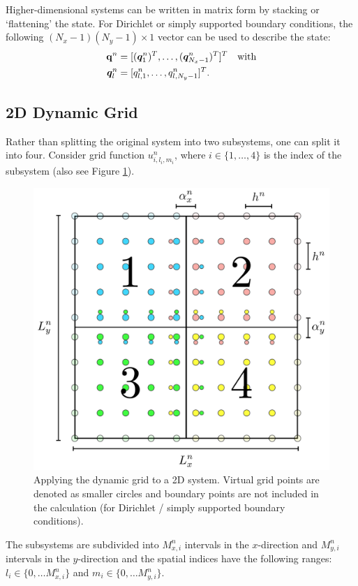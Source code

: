 \documentclass[fleqn]{jaes}
\begin{document}
Higher-dimensional systems can be written in matrix form by stacking or `flattening' the state. For Dirichlet or simply supported boundary conditions, the following $(N_x-1)(N_y-1)\times 1$ vector can be used to describe the state:
\begin{equation}\label{eq:stackedQ}
    \begin{aligned}
        \q^n &= [(\qq_{1}^n)^T, \hdots, (\qq_{N_x-1}^n)^T]^T \quad \text{with}\\
        \qq_l^n &= [q_{l, 1}^n, \hdots, q_{l, N_y-1}^n ]^T.
    \end{aligned}
\end{equation}

\subsection{2D Dynamic Grid}
Rather than splitting the original system into two subsystems, one can split it into four. Consider grid function $u_{i, l_i, m_i}^n$, where $i\in\{1, \hdots, 4\}$ is the index of the subsystem (also see Figure \ref{fig:2DGrid}). 
\begin{figure}[b]
    \centering
    \includegraphics[width=\columnwidth]{2DDynamicGrid.pdf}
    \caption{Applying the dynamic grid to a 2D system. Virtual grid points are denoted as smaller circles and boundary points are not included in the calculation (for Dirichlet / simply supported boundary conditions). 
    }
    \label{fig:2DGrid}
\end{figure}
%
The subsystems are subdivided into $M_{x,i}^n$ intervals in the $x$-direction and $M_{y,i}^n$ intervals in the $y$-direction and the spatial indices have the following ranges: $l_i \in\{0, \hdots M_{x,i}^n\}$ and $m_i \in\{0, \hdots M_{y,i}^n\}$. 
\end{document}
